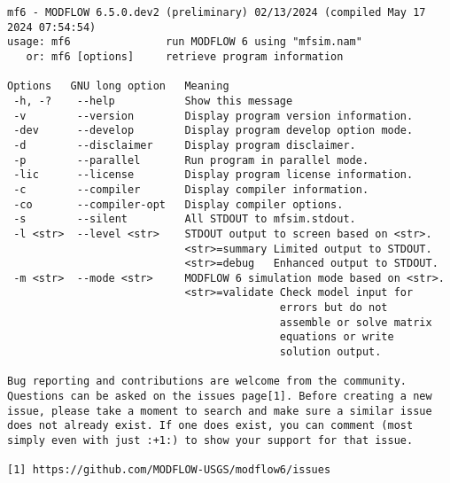 {\small
\begin{lstlisting}[style=modeloutput]
mf6 - MODFLOW 6.5.0.dev2 (preliminary) 02/13/2024 (compiled May 17 2024 07:54:54)
usage: mf6               run MODFLOW 6 using "mfsim.nam"
   or: mf6 [options]     retrieve program information

Options   GNU long option   Meaning 
 -h, -?    --help           Show this message
 -v        --version        Display program version information.
 -dev      --develop        Display program develop option mode.
 -d        --disclaimer     Display program disclaimer.
 -p        --parallel       Run program in parallel mode.
 -lic      --license        Display program license information.
 -c        --compiler       Display compiler information.
 -co       --compiler-opt   Display compiler options.
 -s        --silent         All STDOUT to mfsim.stdout.
 -l <str>  --level <str>    STDOUT output to screen based on <str>.
                            <str>=summary Limited output to STDOUT.
                            <str>=debug   Enhanced output to STDOUT.
 -m <str>  --mode <str>     MODFLOW 6 simulation mode based on <str>.
                            <str>=validate Check model input for
                                           errors but do not 
                                           assemble or solve matrix 
                                           equations or write 
                                           solution output.
                                                                    
Bug reporting and contributions are welcome from the community. 
Questions can be asked on the issues page[1]. Before creating a new
issue, please take a moment to search and make sure a similar issue
does not already exist. If one does exist, you can comment (most
simply even with just :+1:) to show your support for that issue.
                                                                    
[1] https://github.com/MODFLOW-USGS/modflow6/issues
\end{lstlisting}
}
